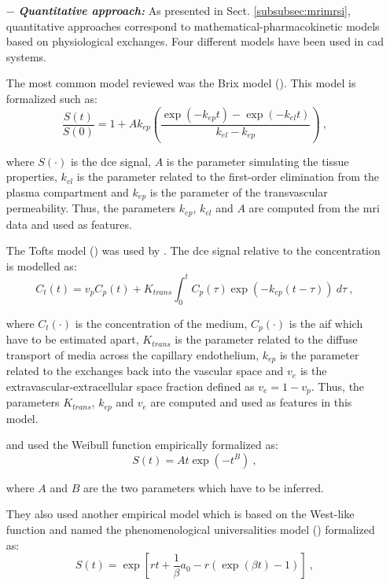\begin{enumerate}[leftmargin=*]
\item[$-$] \textbf{\textit{Quantitative approach:}} As presented in Sect. \ref{subsubsec:mrimrsi}, quantitative approaches correspond to mathematical-pharmacokinetic models based on physiological exchanges. Four different models have been used in \ac{cad} systems. 

The most common model reviewed was the Brix model (\cite{Artan2009,Artan2010,Sung2011,Liu2009,Ozer2009,Ozer2010}). This model is formalized such as:
\begin{equation}
	\frac{S(t)}{S(0)} = 1 + A k_{ep} \left( \frac{\exp( -k_{ep} t ) - \exp( -k_{el} t )}{k_{el} - k_{ep}} \right) \ ,
	\label{eq:brixmod}
\end{equation}

\noindent where $S(\cdot)$ is the \ac{dce} signal, $A$ is the parameter simulating the tissue properties, $k_{el}$ is the parameter related to the first-order elimination from the plasma compartment and $k_{ep}$ is the parameter of the transvascular permeability. Thus, the parameters $k_{ep}$, $k_{el}$ and $A$ are computed from the \ac{mri} data and used as features.

The Tofts model (\cite{Tofts1997}) was used by \cite{Langer2009,Giannini2013,Niaf2011,Niaf2012,Mazzetti2011}. The \ac{dce} signal relative to the concentration is modelled as:
\begin{equation}
	C_t(t) = v_p C_p(t) + K_{trans} \int_{0}^{t} C_p(\tau) \exp( -k_{ep}(t-\tau) ) \ d\tau \ ,
	\label{eq:tofts} 
\end{equation}

\noindent where $C_t(\cdot)$ is the concentration of the medium, $C_p(\cdot)$ is the \ac{aif} which have to be estimated apart, $K_{trans}$ is the parameter related to the diffuse transport of media across the capillary endothelium, $k_{ep}$ is the parameter related to the exchanges back into the vascular space and $v_e$ is the extravascular-extracellular space fraction defined as $v_e = 1 - v_p$. Thus, the parameters $K_{trans}$, $k_{ep}$ and $v_e$ are computed and used as features in this model.

\cite{Mazzetti2011} and \cite{Giannini2013} used the Weibull function empirically formalized as:
\begin{equation}
	S(t) = A t \exp( -t^{B} ) \ ,
	\label{eq:weibull}
\end{equation}

\noindent where $A$ and $B$ are the two parameters which have to be inferred.

They also used another empirical model which is based on the West-like function and named the phenomenological universalities model (\cite{Castorina2006}) formalized as:
\begin{equation}
	S(t) = \exp \left[ r t + \frac{1}{\beta} a_0 - r \left( \exp( \beta t ) - 1 \right) \right] \ ,
	\label{eq:pun}
\end{equation}


\end{enumerate}
